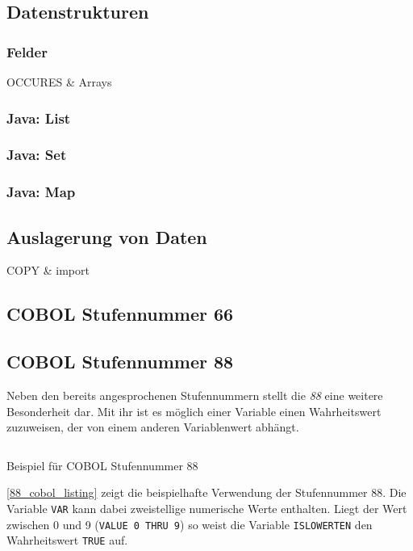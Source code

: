 \subsection{Datenstrukturen}

\subsubsection{Felder}
OCCURES \& Arrays

\subsubsection{Java: List}

\subsubsection{Java: Set}

\subsubsection{Java: Map}

\subsection{Auslagerung von Daten}
COPY \& import

\subsection{COBOL Stufennummer 66}

\pagebreak \subsection{COBOL Stufennummer 88}
Neben den bereits angesprochenen Stufennummern stellt die \textit{88} eine weitere Besonderheit dar. Mit ihr ist es möglich einer Variable einen Wahrheitswert zuzuweisen, der von einem anderen Variablenwert abhängt. 

\begin{listing}[H]
  \inputminted[bgcolor=mintedgrey,xleftmargin=20pt,linenos,fontsize=\footnotesize]{cobol}{code/88_section.cbl.txt}
  \caption{Beispiel für COBOL Stufennummer 88}
  \label{88_cobol_listing}
\end{listing} 

\autoref{88_cobol_listing} zeigt die beispielhafte Verwendung der Stufennummer 88. Die Variable \texttt{VAR} kann dabei zweistellige numerische Werte enthalten. Liegt der Wert zwischen 0 und 9 (\texttt{VALUE 0 THRU 9}) so weist die Variable \texttt{ISLOWERTEN} den Wahrheitswert \texttt{TRUE} auf.

